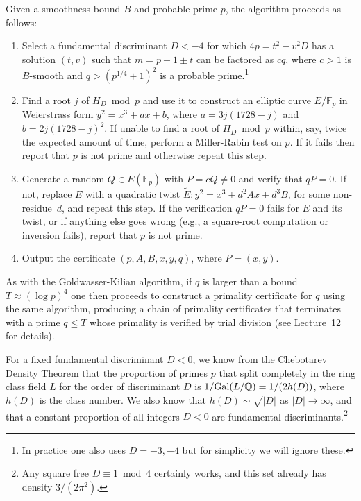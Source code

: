 \documentclass[11pt]{article}
\newcommand{\Fp}{\mathbb{F}_p}
\newcommand{\Q}{\mathbb{Q}}
\newcommand{\Gal}{{\rm Gal}}
\begin{document}
\noindent
Given a smoothness bound $B$ and probable prime $p$, the algorithm proceeds as follows:
\begin{enumerate}
\item Select a fundamental discriminant $D<-4$ for which $4p=t^2-v^2D$ has a solution $(t,v)$ such that $m=p+1\pm t$ can be factored as $cq$, where $c>1$ is $B$-smooth and $q>(p^{1/4}+1)^2$ is a probable prime.\footnote{In practice one also uses $D=-3,-4$ but for simplicity we will ignore these.}
\item Find a root $j$ of $H_D\bmod p$ and use it to construct an elliptic curve $E/\Fp$ in Weierstrass form $y^2=x^3+ax+b$, where $a=3j(1728-j)$ and $b=2j(1728-j)^2$.  If unable to find a root of $H_D\bmod p$ within, say, twice the expected amount of time, perform a Miller-Rabin test on $p$.
If it fails then report that $p$ is not prime and otherwise repeat this step.
\item Generate a random $Q\in E(\Fp)$ with $P=cQ\ne 0$ and verify that $qP=0$.  If not, replace $E$ with a quadratic twist $\tilde{E}\colon y^2=x^3+d^2Ax+d^3B$, for some non-residue~$d$, and repeat this step.  If the verification $qP=0$ fails for $E$ and its twist, or if anything else goes wrong (e.g., a square-root computation or inversion fails), report that $p$ is not prime.
\item Output the certificate $(p,A,B,x,y,q)$, where $P=(x,y)$.
\end{enumerate}

As with the Goldwasser-Kilian algorithm, if $q$ is larger than a bound $T\approx (\log p)^4$ one then proceeds to construct a primality certificate for $q$ using the same algorithm,  producing a chain of primality certificates that terminates with a prime $q\le T$ whose primality is verified by trial division (see Lecture~12 for details).

For a fixed fundamental discriminant $D<0$, we know from the Chebotarev Density Theorem that the proportion of primes $p$ that split completely in the ring class field $L$ for the order of discriminant $D$ is $1/\Gal(L/\Q)=1/(2h(D))$, where $h(D)$ is the class number.  We also know that $h(D)\sim \sqrt{|D|}$ as $|D|\to\infty$, and that a constant proportion of all integers $D<0$ are fundamental discriminants.\footnote{Any square free $D\equiv 1\bmod 4$ certainly works, and this set already has density $3/(2\pi^2)$.}
\end{document}

